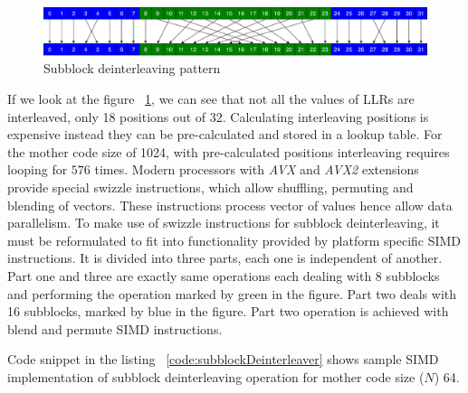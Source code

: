 \begin{figure}[]
	\centering
	\includegraphics[width=1.0\textwidth]{./figures/subblockDeinterleaver.pdf}
	\caption{Subblock deinterleaving pattern}
	\label{fig:subblockDeinterleaver}
\end{figure}

If we look at the figure ~\ref{fig:subblockDeinterleaver}, we can see that not all the values of LLRs are interleaved, only 18 positions out of 32. Calculating interleaving positions is expensive instead they can be pre-calculated and stored in a lookup table. For the mother code size of 1024, with pre-calculated positions interleaving requires looping for $ 576 $ times. Modern processors with \textit{AVX} and \textit{AVX2} extensions provide special swizzle instructions, which allow shuffling, permuting and blending of vectors. These instructions process vector of values hence allow data parallelism. To make use of swizzle instructions for subblock deinterleaving, it must be reformulated to fit into functionality provided by platform specific SIMD instructions. It is divided into three parts, each one is independent of another. Part one and three are exactly same operations each dealing with 8 subblocks and performing the operation marked by green in the figure. Part two deals with 16 subblocks, marked by blue in the figure. Part two operation is achieved with blend and permute SIMD instructions.

Code snippet in the listing ~\ref{code:subblockDeinterleaver} shows sample SIMD implementation of subblock deinterleaving operation for mother code size ($N$) 64.

